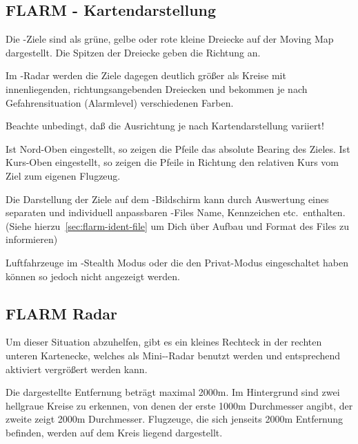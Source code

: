 \subsection*{FLARM - Kartendarstellung}
Die \fl-Ziele sind als grüne, gelbe  oder rote kleine Dreiecke auf der Moving Map dargestellt.
Die Spitzen der Dreiecke geben die Richtung an.

Im \fl-Radar werden die Ziele dagegen deutlich größer als Kreise mit innenliegenden,
richtungsangebenden Dreiecken  und bekommen je nach Gefahrensituation (Alarmlevel)
verschiedenen Farben.

\achtung Beachte unbedingt, daß die Ausrichtung je nach Kartendarstellung variiert!

Ist Nord-Oben eingestellt, so zeigen die Pfeile das absolute Bearing des Zieles.
Ist Kurs-Oben eingestellt, so zeigen die Pfeile in Richtung den relativen Kurs vom Ziel
zum eigenen Flugzeug.



Die Darstellung der Ziele auf dem \fl-Bildschirm kann durch Auswertung eines separaten
und individuell anpassbaren  \fl-Files Name, Kennzeichen etc.\ enthalten.
(Siehe hierzu~\ref{sec:flarm-ident-file} um Dich über Aufbau und Format des Files zu informieren)

Luftfahrzeuge im \fl-Stealth Modus oder die den Privat-Modus eingeschaltet haben können so jedoch nicht angezeigt werden.

\subsection*{FLARM Radar}
Um dieser Situation abzuhelfen, gibt es ein kleines Rechteck in der rechten unteren Kartenecke,
welches als Mini-\fl-Radar benutzt werden und entsprechend aktiviert vergrößert werden kann.

Die dargestellte Entfernung beträgt maximal 2000m. Im Hintergrund sind zwei hellgraue Kreise zu erkennen,
von denen der erste 1000m Durchmesser angibt, der zweite zeigt 2000m Durchmesser.
Flugzeuge, die sich jenseits 2000m Entfernung befinden, werden auf dem Kreis liegend dargestellt.


